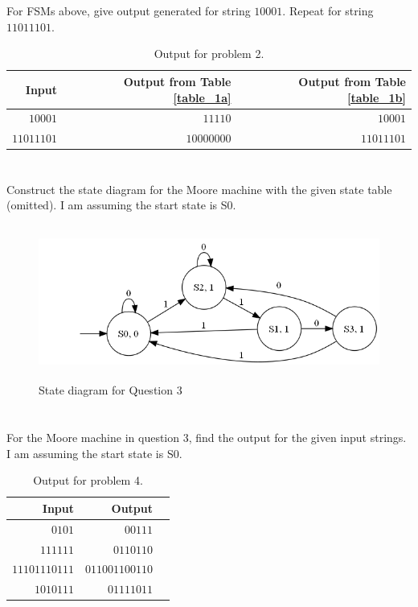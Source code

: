 \documentclass{article}
\begin{document}
\section{}

For FSMs above, give output generated for string $10001$. Repeat for string
$11011101$.

\begin{table}[h!]
	\centering
	\begin{tabular}{ r || r | r }
	Input & Output from Table \ref{table_1a} & Output from Table \ref{table_1b} \\
	\hline      
	$10001$    & $11110$                    & $10001$ \\
	$11011101$ & $10000000$                 & $11011101$ \\
	\end{tabular}
	\caption{Output for problem 2.}
	\label{table_3}
\end{table}

\section{}

Construct the state diagram for the Moore machine with the given state table
(omitted). I am assuming the start state is S0. 

\begin{figure}[h!]
	\includegraphics[height=2.0in]{3.png}
	\caption{State diagram for Question 3}
\end{figure}

\section{}

For the Moore machine in question 3, find the output for the given input
strings. I am assuming the start state is S0.

\begin{table}[h!]
	\centering
	\begin{tabular}{ r || r | r }
	Input & Output \\
	\hline      
	$0101$        & $00111$ \\
	$111111$      & $0110110$ \\
	$11101110111$ & $011001100110$ \\
	$1010111$     & $01111011$ \\
	\end{tabular}
	\caption{Output for problem 4.}
	\label{table_3}
\end{table}
\end{document}
